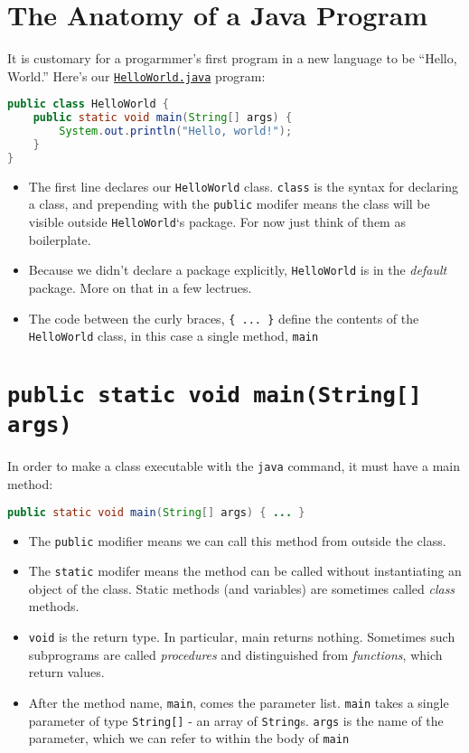 \documentclass{article}
\begin{document}
\section{The Anatomy of a Java Program}


It is customary for a progarmmer's first program in a new language to be ``Hello, World.''  Here's our \href{\code/basics/HelloWorld.java}{{\tt HelloWorld.java}} program:
\begin{lstlisting}[language=Java]
public class HelloWorld {
    public static void main(String[] args) {
        System.out.println("Hello, world!");
    }
}
\end{lstlisting}
\vspace{-.1in}
\begin{itemize}
\item The first line declares our {\tt HelloWorld} class.  {\tt class} is the syntax for declaring a class, and prepending with the {\tt public} modifer means the class will be visible outside {\tt HelloWorld}`s package.  For now just think of them as boilerplate.
\item Because we didn't declare a package explicitly, {\tt HelloWorld} is in the {\it default} package.  More on that in a few lectrues.
\item The code between the curly braces, {\tt \{ ... \}} define the contents of the {\tt HelloWorld} class, in this case a single method, {\tt main}
\end{itemize}


\section{{\tt public static void main(String[] args)}}


In order to make a class executable with the {\tt java} command, it must have a main method:
\begin{lstlisting}[language=Java]
public static void main(String[] args) { ... }
\end{lstlisting}
\vspace{-.1in}
\begin{itemize}
\item The {\tt public} modifier means we can call this method from outside the class.
\item The {\tt static} modifer means the method can be called without instantiating an object of the class.  Static methods (and variables) are sometimes called {\it class} methods.
\item {\tt void} is the return type.  In particular, main returns nothing.  Sometimes such subprograms are called {\it procedures} and distinguished from {\it functions}, which return values.
\item After the method name, {\tt main}, comes the parameter list.  {\tt main} takes a single parameter of type {\tt String[]} - an array of {\tt String}s.  {\tt args} is the name of the parameter, which we can refer to within the body of {\tt main}
\end{itemize}
\end{document}
